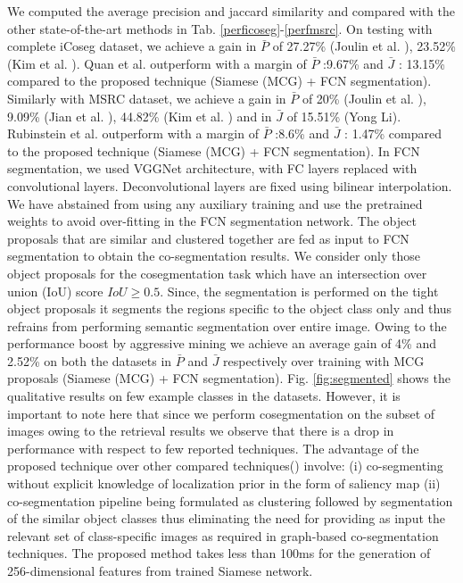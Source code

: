 \documentclass[conference]{IEEEtran}
\begin{document}
We computed the average precision and jaccard similarity and compared with the other state-of-the-art methods in Tab. \ref{perficoseg}-\ref{perfmsrc}. On testing with complete iCoseg dataset, we achieve a gain in $\bar{\textit{P}}$ of 27.27\% (Joulin et al. \cite{joulin2010discriminative}), 23.52\% (Kim et al. \cite{kim2012multiple}). Quan et al. \cite{quan2016object} outperform with a margin of $\bar{\textit{P}}$ :9.67\% and $\bar{\textit{J}}$ : 13.15\% compared to the proposed technique (Siamese (MCG) + FCN segmentation). Similarly with MSRC dataset, we achieve a gain in $\bar{\textit{P}}$ of 20\% (Joulin et al. \cite{joulin2010discriminative}), 9.09\% (Jian et al. \cite{sun2016learning}), 44.82\% (Kim et al. \cite{kim2012multiple}) and in $\bar{\textit{J}}$ of 15.51\% (Yong Li\cite{li2016object}). Rubinstein et al.\cite{Rubinstein13Unsupervised} outperform with a margin of $\bar{\textit{P}}$ :8.6\% and $\bar{\textit{J}}$ : 1.47\% compared to the proposed technique (Siamese (MCG) + FCN segmentation). In FCN segmentation, we used VGGNet architecture, with FC layers replaced with convolutional layers. Deconvolutional layers are fixed using bilinear interpolation. We have abstained from using any auxiliary training and use the pretrained weights to avoid over-fitting in the FCN segmentation network. The object proposals that are similar and clustered together are fed as input to FCN segmentation to obtain the co-segmentation results. We consider only those object proposals for the cosegmentation task which have an intersection over union (IoU) score $IoU\geq0.5$. Since, the segmentation is performed on the tight object proposals it segments the regions specific to the object class only and thus refrains from performing semantic segmentation over entire image. Owing to the performance boost by aggressive mining we achieve an average gain of 4\% and 2.52\% on both the datasets in $\bar{\textit{P}}$ and $\bar{\textit{J}}$ respectively over training with MCG proposals (Siamese (MCG) + FCN segmentation). Fig. \ref{fig:segmented} shows the qualitative results on few example classes in the datasets. However, it is important to note here that since we perform cosegmentation on the subset of images owing to the retrieval results we observe that there is a drop in performance with respect to few reported techniques. The advantage of the proposed technique over other compared techniques(\cite{Rubinstein13Unsupervised,li2016object,joulin2010discriminative,kim2012multiple,quan2016object,meng2016cosegmentation,faktor2013co}) involve: (i) co-segmenting without explicit knowledge of localization prior in the form of saliency map (ii) co-segmentation pipeline being formulated as clustering followed by segmentation of the similar object classes thus eliminating the need for providing as input the relevant set of class-specific images as required in graph-based co-segmentation techniques. The proposed method takes less than 100ms for the generation of 256-dimensional features from trained Siamese network.
\end{document}

